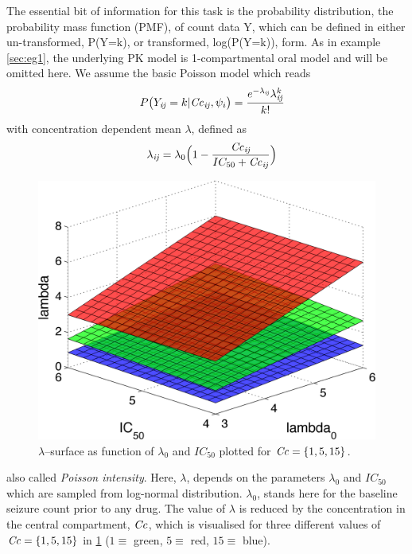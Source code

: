 The essential bit of information for this task is the probability distribution, the probability 
mass function (PMF), of count data Y, which can be defined in either un-transformed, 
P(Y=k), or transformed, log(P(Y=k)), form. As in example \ref{sec:eg1}, the underlying 
PK model is 1-compartmental oral model and will be omitted here. We assume the basic 
Poisson model which reads
\begin{eqnarray}
&& P\big(Y_{\mathit{ij}}=k | \mathit{Cc}_{\mathit{ij}}, \psi_i\big) =  \frac{e^{-\lambda_{\mathit{ij}}} \lambda^k_{\mathit{ij}}}{k!} \label{eq:poissonModel}
\end{eqnarray}
with concentration dependent mean $\lambda$, defined as
\begin{eqnarray}
&& \lambda_{\mathit{ij}} = \lambda_0 \Big(1 - \frac{\mathit{Cc}_{\mathit{ij}}}{IC_{50} + \mathit{Cc}_{\mathit{ij}}}\Big)  \label{eq:lambdasurface}
\end{eqnarray}
\begin{figure}[htbp]
\centering
\includegraphics[width=.43\textwidth]{pics/CTS4_lambda_threeSurfaces} 
\caption{$\lambda$--surface as function of $\lambda_0$ and $IC_{50}$ 
plotted for $\mathit{Cc} = \{1,5,15\}$.}
\label{fig:lambdasurface}
\end{figure}
also called \emph{Poisson intensity}. Here, $\lambda$, depends on the parameters 
$\lambda_0$ and $IC_{50}$ which are sampled from log-normal distribution. 
$\lambda_0$, stands here for the baseline seizure count prior to any drug. 
The value of $\lambda$ is reduced by the concentration in the central 
compartment, $\mathit{Cc}$, which is visualised for three different values 
of $\mathit{Cc} = \{1,5,15\}$ in \ref{fig:lambdasurface} ($1\equiv$ green, $5 \equiv$ 
red, $15 \equiv$ blue).


